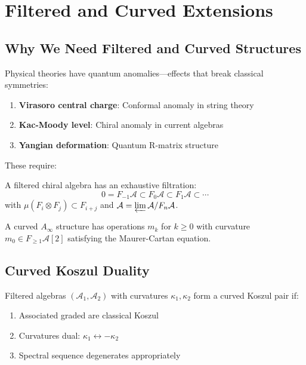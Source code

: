 \section{Filtered and Curved Extensions}

\subsection{Why We Need Filtered and Curved Structures}

Physical theories have quantum anomalies—effects that break classical symmetries:

\begin{example}
\begin{enumerate}
\item \textbf{Virasoro central charge}: Conformal anomaly in string theory
\item \textbf{Kac-Moody level}: Chiral anomaly in current algebras  
\item \textbf{Yangian deformation}: Quantum R-matrix structure
\end{enumerate}
\end{example}

These require:

\begin{definition}
A filtered chiral algebra has an exhaustive filtration:
$$0 = F_{-1}\mathcal{A} \subset F_0\mathcal{A} \subset F_1\mathcal{A} \subset \cdots$$
with $\mu(F_i \otimes F_j) \subset F_{i+j}$ and $\mathcal{A} = \varprojlim \mathcal{A}/F_n\mathcal{A}$.
\end{definition}

\begin{definition}
A curved $A_\infty$ structure has operations $m_k$ for $k \geq 0$ with curvature $m_0 \in F_{\geq 1}\mathcal{A}[2]$ satisfying the Maurer-Cartan equation.
\end{definition}

\subsection{Curved Koszul Duality}

\begin{theorem}
Filtered algebras $(\mathcal{A}_1, \mathcal{A}_2)$ with curvatures $\kappa_1, \kappa_2$ form a curved Koszul pair if:
\begin{enumerate}
\item Associated graded are classical Koszul
\item Curvatures dual: $\kappa_1 \leftrightarrow -\kappa_2$
\item Spectral sequence degenerates appropriately
\end{enumerate}
\end{theorem}

